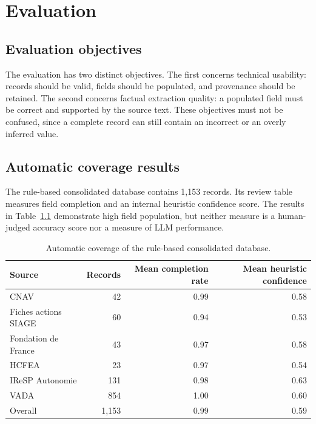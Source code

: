 
\chapter{Evaluation}

\section{Evaluation objectives}

The evaluation has two distinct objectives. The first concerns technical
usability: records should be valid, fields should be populated, and provenance
should be retained. The second concerns factual extraction quality: a populated
field must be correct and supported by the source text. These objectives must
not be confused, since a complete record can still contain an incorrect or an
overly inferred value.

\section{Automatic coverage results}

The rule-based consolidated database contains 1,153 records. Its review table
measures field completion and an internal heuristic confidence score. The
results in Table~\ref{tab:coverage-results} demonstrate high field population,
but neither measure is a human-judged accuracy score nor a measure of LLM
performance.

\begin{table}[H]
\centering
\begin{tabular}{lrrr}
\toprule
Source & Records & Mean completion rate & Mean heuristic confidence \\
\midrule
CNAV & 42 & 0.99 & 0.58 \\
Fiches actions SIAGE & 60 & 0.94 & 0.53 \\
Fondation de France & 43 & 0.97 & 0.58 \\
HCFEA & 23 & 0.97 & 0.54 \\
IReSP Autonomie & 131 & 0.98 & 0.63 \\
VADA & 854 & 1.00 & 0.60 \\
\midrule
Overall & 1,153 & 0.99 & 0.59 \\
\bottomrule
\end{tabular}
\caption{Automatic coverage of the rule-based consolidated database.}
\label{tab:coverage-results}
\end{table}

